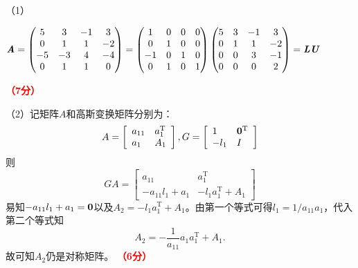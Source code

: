\documentclass[12pt,a4paper,openany,twoside]{ctexbook}
\begin{document}
\begin{Solution}
	（1）\begin{center}
		$\boldsymbol{\mathit{A}}=\begin{pmatrix}
			5& 3& -1&  3\\
			0& 1&  1& -2\\
			-5& -3&  4& -4\\
			0&  1&  1&  0\\
		\end{pmatrix}
		=
		\begin{pmatrix}
			1& 0& 0&  0\\
			0& 1&  0& 0\\
			-1& 0&  1& 0\\
			0&  1&  0&  1\\
		\end{pmatrix}
		\begin{pmatrix}
			5& 3& -1&  3\\
			0& 1&  1& -2\\
			0& 0&  3& -1\\
			0&  0&  0&  2\\
		\end{pmatrix}
		=\boldsymbol{\mathit{L}}\boldsymbol{\mathit{U}}$
	\end{center}
	\hfill \textcolor{red}{\textbf{（7分）}}
	
	（2）记矩阵$A$和高斯变换矩阵分别为：
	$$
	A = \left[\begin{array}{ll}
		a_{11} & a_1^{\mathrm{T}} \\
		a_1 & A_1
	\end{array}\right],
	G = \left[\begin{array}{ll}
		1 & \boldsymbol{0}^{\mathrm{T}} \\
		-l_1 & I
	\end{array}\right]
	$$
	则
	$$
	GA=\left[\begin{array}{ll}
		a_{11} & a_1^{\mathrm{T}} \\
		-a_{11} l_1+a_1 & -l_1 a_1^{\mathrm{T}} + A_1
	\end{array}\right]
	$$
	易知$-a_{11} l_1+a_1=\boldsymbol{0}$以及$A_2=-l_1 a_1^{\mathrm{T}} + A_1$。由第一个等式可得$l_1=1/a_{11} a_1$，代入第二个等式知
	$$A_2=-\frac{1}{a_{11}} a_1 a_1^{\mathrm{T}} + A_1.$$
	故可知$A_2$仍是对称矩阵。 \hfill \textcolor{red}{\textbf{（6分）}}
\end{Solution}
\end{document}

